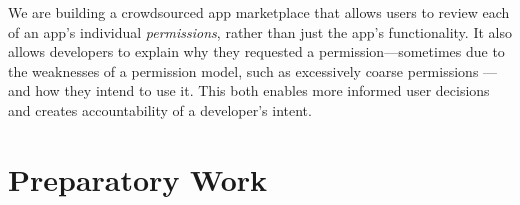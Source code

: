 \documentclass[11pt]{article}
\begin{document}
We are building a crowdsourced app marketplace that allows users to review
each of an app's individual \emph{permissions}, rather than just the app's functionality. 
It also allows developers to
explain why they requested a permission---sometimes due to the
weaknesses of a permission model, such as excessively coarse permissions
\cite{permission-tracking-UBICOMM12}---and how they intend to use it. This both enables more
informed user decisions and creates accountability of a developer's intent.




\section{Preparatory Work}
\label{sec-prep-work}
\end{document}
